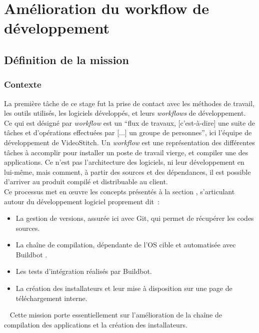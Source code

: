 \chapter{Amélioration du workflow de développement}

\section{Définition de la mission}
\subsection{Contexte}
La première tâche de ce stage fut la prise de contact avec 
les méthodes de travail, les outils utilisés, les logiciels développés, et leurs
\textit{workflows} de développement.\\
Ce qui est désigné par \textit{workflow} est un 
\enquote{flux de travaux, [c'est-à-dire] une suite de tâches et
d'opérations effectuées par [...] un groupe de personnes}\cite{workflow}, ici l'équipe de développement
de VideoStitch. Un \textit{workflow} est une représentation des différentes tâches à accomplir pour installer
un poste de travail vierge, et compiler une des applications.
Ce n'est pas l'architecture des logiciels, ni leur développement en lui-même,
mais comment, à partir des sources et des dépendances, il est possible d'arriver au produit
compilé et distribuable au client.\\
Ce processus met en \oe uvre les concepts présentés à la section 
, s'articulant autour du développement
logiciel proprement dit\cite{software-build}\cite{build-automation}~:
\begin{itemize}
  \item La gestion de versions, assurée ici avec Git\cite{gestion-versions}, qui permet
  de récupérer les codes sources.
  \item La chaîne de compilation, dépendante de l'OS cible et automatisée avec Buildbot 
  \cite{chaine-compilation}\cite{integration-continue}.
  \item Les tests d'intégration\cite{integration-continue} réalisés par Buildbot.
  \item La création des installateurs et leur mise à disposition sur une page de téléchargement interne.
\end{itemize}
\ \newline
Cette mission porte essentiellement sur l'amélioration de la chaîne de compilation
des applications et la création des installateurs.

